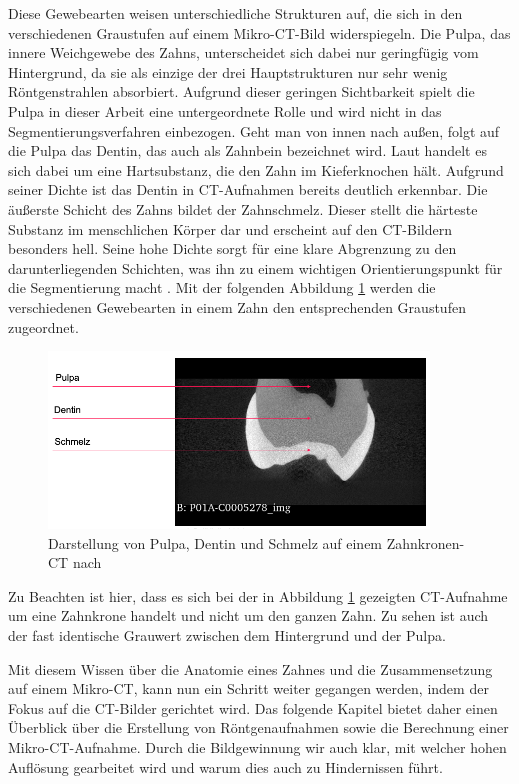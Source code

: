 Diese Gewebearten weisen unterschiedliche Strukturen auf, die sich in den
verschiedenen Graustufen auf einem Mikro-\ac{CT}-Bild widerspiegeln. Die Pulpa, das
innere Weichgewebe des Zahns, unterscheidet sich dabei nur geringfügig vom
Hintergrund, da sie als einzige der drei Hauptstrukturen nur sehr wenig Röntgenstrahlen
absorbiert. Aufgrund dieser geringen Sichtbarkeit spielt die Pulpa in dieser
Arbeit eine untergeordnete Rolle und wird nicht in das Segmentierungsverfahren
einbezogen. Geht man von innen nach außen, folgt auf die Pulpa das Dentin, das auch
als Zahnbein bezeichnet wird. Laut \citet[S.~41]{lehmann2012Zahnheilkunde} handelt
es sich dabei um eine Hartsubstanz, die den Zahn im Kieferknochen hält. Aufgrund
seiner Dichte ist das Dentin in \ac{CT}-Aufnahmen bereits deutlich erkennbar. Die
äußerste Schicht des Zahns bildet der Zahnschmelz. Dieser stellt die härteste
Substanz im menschlichen Körper dar und erscheint auf den \ac{CT}-Bildern besonders
hell. Seine hohe Dichte sorgt für eine klare Abgrenzung zu den darunterliegenden
Schichten, was ihn zu einem wichtigen Orientierungspunkt für die Segmentierung macht
\citep[vgl.][S.~41]{lehmann2012Zahnheilkunde}. Mit der folgenden Abbildung \ref{fig:pulpa_dentin_schmelz}
werden die verschiedenen Gewebearten in einem Zahn den entsprechenden Graustufen
zugeordnet.

\begin{figure}[h]
	\centering
	\includegraphics[width=0.9\textwidth]{img/dentin_schmelz_pulpa.png}
	\caption{Darstellung von Pulpa, Dentin und Schmelz auf einem Zahnkronen-CT nach
	\citet{heck2024}}
	\label{fig:pulpa_dentin_schmelz}
\end{figure}

Zu Beachten ist hier, dass es sich bei der in Abbildung \ref{fig:pulpa_dentin_schmelz}
gezeigten \ac{CT}-Aufnahme um eine Zahnkrone handelt und nicht um den ganzen
Zahn. Zu sehen ist auch der fast identische Grauwert zwischen dem Hintergrund und
der Pulpa.

Mit diesem Wissen über die Anatomie eines Zahnes und die Zusammensetzung auf einem
Mikro-CT, kann nun ein Schritt weiter gegangen werden, indem der Fokus auf die \ac{CT}-Bilder
gerichtet wird. Das folgende Kapitel bietet daher einen Überblick über die Erstellung
von Röntgenaufnahmen sowie die Berechnung einer Mikro-\ac{CT}-Aufnahme. Durch die
Bildgewinnung wir auch klar, mit welcher hohen Auflösung gearbeitet wird und
warum dies auch zu Hindernissen führt.

